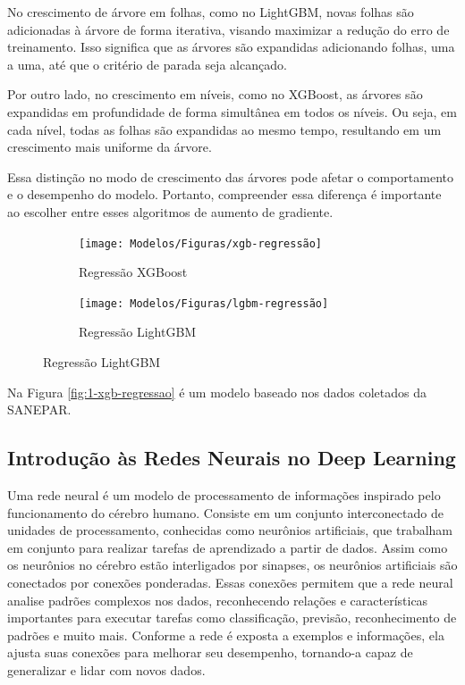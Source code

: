 No crescimento de árvore em folhas, como no LightGBM, novas folhas são adicionadas à árvore de forma iterativa, visando maximizar a redução do erro de treinamento. Isso significa que as árvores são expandidas adicionando folhas, uma a uma, até que o critério de parada seja alcançado.

Por outro lado, no crescimento em níveis, como no XGBoost, as árvores são expandidas em profundidade de forma simultânea em todos os níveis. Ou seja, em cada nível, todas as folhas são expandidas ao mesmo tempo, resultando em um crescimento mais uniforme da árvore.

Essa distinção no modo de crescimento das árvores pode afetar o comportamento e o desempenho do modelo. Portanto, compreender essa diferença é importante ao escolher entre esses algoritmos de aumento de gradiente.

\begin{figure}[!htb]
	\centering
	\caption{A performance da regressão utilizando XGBoost e LightGBM é comparada}
	\label{fig:1-xgb-regressao}
	
	\begin{subfigure}{1\textwidth}
		\texttt{[image: Modelos/Figuras/xgb-regressão]}
		\caption{Regressão XGBoost}	
	\end{subfigure}\hfill
	\begin{subfigure}{1\textwidth}
		\texttt{[image: Modelos/Figuras/lgbm-regressão]}
		\caption{Regressão LightGBM}	
	\end{subfigure}
	

\end{figure}	


Na Figura \ref{fig:1-xgb-regressao} é um modelo baseado nos dados coletados da SANEPAR.
\subsection{Introdu\c c\~ao \`as Redes Neurais no Deep Learning}

Uma rede neural é um modelo de processamento de informações inspirado pelo funcionamento do cérebro humano. Consiste em um conjunto interconectado de unidades de processamento, conhecidas como neurônios artificiais, que trabalham em conjunto para realizar tarefas de aprendizado a partir de dados. Assim como os neurônios no cérebro estão interligados por sinapses, os neurônios artificiais são conectados por conexões ponderadas. Essas conexões permitem que a rede neural analise padrões complexos nos dados, reconhecendo relações e características importantes para executar tarefas como classificação, previsão, reconhecimento de padrões e muito mais. Conforme a rede é exposta a exemplos e informações, ela ajusta suas conexões para melhorar seu desempenho, tornando-a capaz de generalizar e lidar com novos dados.


